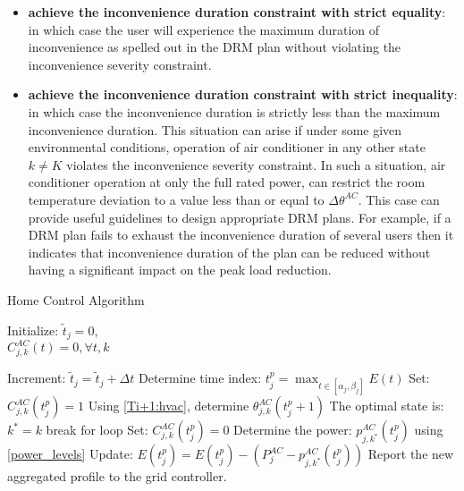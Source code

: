 \documentclass[10pt,twocolumn,twoside]{IEEEtran}
\begin{document}
\begin{itemize}
	\item \textbf{achieve the inconvenience duration constraint with strict equality}: in which case the user will experience the maximum duration of inconvenience as spelled out in the DRM plan without violating the inconvenience severity constraint.
	\item \textbf{achieve the inconvenience duration constraint with strict inequality}: in which case the inconvenience duration is strictly less than the maximum inconvenience duration. This situation can arise if under some given environmental conditions, operation of air conditioner in any other state $k\neq K$ violates the inconvenience severity constraint. In such a situation, air conditioner operation at only the full rated power, can restrict the room temperature deviation to a value less than or equal to $\Delta{\theta^{AC}}$. This case can provide useful guidelines to design appropriate DRM plans. For example, if a DRM plan fails to exhaust the inconvenience duration of several users then it indicates that inconvenience duration of the plan can be reduced without having a significant impact on the peak load reduction.
\end{itemize}

\begin{algorithm}[htb]
\caption{Home Control Algorithm}
\label{alg:home}
Initialize: $\tilde{t}_j=0$, \\
$C^{AC}_{j,k}(t)=0, \forall t,k$
\begin{algorithmic}[1]
\STATE Increment: $\tilde{t}_j=\tilde{t}_j+\Delta t$
\STATE Determine time index: $t_j^p=\max_{t\in [\alpha_j, \beta_j]} E(t)$
\STATE Set: $C^{AC}_{j,k}(t_j^p)=1$
\STATE Using \eqref{Ti+1:hvac}, determine $\theta^{AC}_{j,k}(t_j^p+1)$ 
\STATE The optimal state is: $k^*=k$
\STATE break for loop
\ELSE 
\STATE Set: $C^{AC}_{j,k}(t_j^p)=0$
\ENDIF
\ENDFOR
\STATE Determine the power: $p^{AC}_{j,k^*}(t_j^p)$ using \eqref{power_levels}
\STATE Update: $E(t_j^p)=E(t_j^p)-\left(P^{AC}_{j}-p^{AC}_{j,k^*}(t_j^p)\right)$
\ENDFOR
\STATE Report the new aggregated profile to the grid controller.
\end{algorithmic}
\end{algorithm}
\end{document}
